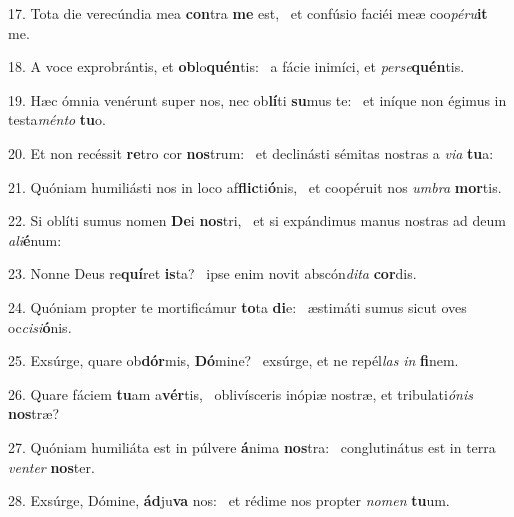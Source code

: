 17. Tota die verecúndia mea \textbf{con}tra \textbf{me} est, \ast\  et confúsio faciéi meæ coo\textit{pé}\textit{ru}\textbf{it} me.\

18. A voce exprobrántis, et \textbf{ob}lo\textbf{quén}tis: \ast\  a fácie inimíci, et \textit{per}\textit{se}\textbf{quén}tis.\

19. Hæc ómnia venérunt super nos, nec ob\textbf{lí}ti \textbf{su}mus te: \ast\  et iníque non égimus in testa\textit{mén}\textit{to} \textbf{tu}o.\

20. Et non recéssit \textbf{re}tro cor \textbf{nos}trum: \ast\  et declinásti sémitas nostras a \textit{vi}\textit{a} \textbf{tu}a:\

21. Quóniam humiliásti nos in loco af\textbf{flic}ti\textbf{ó}nis, \ast\  et coopéruit nos \textit{um}\textit{bra} \textbf{mor}tis.\

22. Si oblíti sumus nomen \textbf{De}i \textbf{nos}tri, \ast\  et si expándimus manus nostras ad deum \textit{a}\textit{li}\textbf{é}num:\

23. Nonne Deus re\textbf{quí}ret \textbf{is}ta? \ast\  ipse enim novit abscón\textit{di}\textit{ta} \textbf{cor}dis.\

24. Quóniam propter te mortificámur \textbf{to}ta \textbf{di}e: \ast\  æstimáti sumus sicut oves oc\textit{ci}\textit{si}\textbf{ó}nis.\

25. Exsúrge, quare ob\textbf{dór}mis, \textbf{Dó}mine? \ast\  exsúrge, et ne repél\textit{las} \textit{in} \textbf{fi}nem.\

26. Quare fáciem \textbf{tu}am a\textbf{vér}tis, \ast\  oblivísceris inópiæ nostræ, et tribulati\textit{ó}\textit{nis} \textbf{nos}træ?\

27. Quóniam humiliáta est in púlvere \textbf{á}nima \textbf{nos}tra: \ast\  conglutinátus est in terra \textit{ven}\textit{ter} \textbf{nos}ter.\

28. Exsúrge, Dómine, \textbf{ád}ju\textbf{va} nos: \ast\  et rédime nos propter \textit{no}\textit{men} \textbf{tu}um.\

